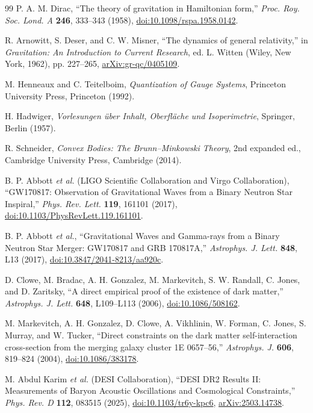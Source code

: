 \documentclass[aps,prd,reprint,nofootinbib,superscriptaddress,floatfix]{revtex4-2}
\numberwithin{equation}{section}
\theoremstyle{definition}
\theoremstyle{plain}
\begin{document}
\begin{thebibliography}{99}
P. A. M. Dirac,
``The theory of gravitation in Hamiltonian form,''
\emph{Proc. Roy. Soc. Lond. A} \textbf{246}, 333--343 (1958),
\href{https://doi.org/10.1098/rspa.1958.0142}{doi:10.1098/rspa.1958.0142}.

R. Arnowitt, S. Deser, and C. W. Misner,
``The dynamics of general relativity,''
in \emph{Gravitation: An Introduction to Current Research},
ed. L. Witten (Wiley, New York, 1962), pp. 227--265,
\href{https://arxiv.org/abs/gr-qc/0405109}{arXiv:gr-qc/0405109}.

M. Henneaux and C. Teitelboim,
\emph{Quantization of Gauge Systems},
Princeton University Press, Princeton (1992).

H. Hadwiger,
\emph{Vorlesungen \"uber Inhalt, Oberfl\"ache und Isoperimetrie},
Springer, Berlin (1957).

R. Schneider,
\emph{Convex Bodies: The Brunn--Minkowski Theory},
2nd expanded ed., Cambridge University Press, Cambridge (2014).

B. P. Abbott \emph{et al.} (LIGO Scientific Collaboration and Virgo Collaboration),
``GW170817: Observation of Gravitational Waves from a Binary Neutron Star Inspiral,''
\emph{Phys. Rev. Lett.} \textbf{119}, 161101 (2017),
\href{https://doi.org/10.1103/PhysRevLett.119.161101}{doi:10.1103/PhysRevLett.119.161101}.

B. P. Abbott \emph{et al.},
``Gravitational Waves and Gamma-rays from a Binary Neutron Star Merger: GW170817 and GRB 170817A,''
\emph{Astrophys. J. Lett.} \textbf{848}, L13 (2017),
\href{https://doi.org/10.3847/2041-8213/aa920c}{doi:10.3847/2041-8213/aa920c}.

D. Clowe, M. Bradac, A. H. Gonzalez, M. Markevitch, S. W. Randall, C. Jones, and D. Zaritsky,
``A direct empirical proof of the existence of dark matter,''
\emph{Astrophys. J. Lett.} \textbf{648}, L109--L113 (2006),
\href{https://doi.org/10.1086/508162}{doi:10.1086/508162}.

M. Markevitch, A. H. Gonzalez, D. Clowe, A. Vikhlinin, W. Forman, C. Jones, S. Murray, and W. Tucker,
``Direct constraints on the dark matter self-interaction cross-section from the merging galaxy cluster 1E 0657--56,''
\emph{Astrophys. J.} \textbf{606}, 819--824 (2004),
\href{https://doi.org/10.1086/383178}{doi:10.1086/383178}.


M. Abdul Karim \emph{et al.} (DESI Collaboration),
``DESI DR2 Results II: Measurements of Baryon Acoustic Oscillations and Cosmological Constraints,''
\emph{Phys. Rev. D} \textbf{112}, 083515 (2025),
\href{https://doi.org/10.1103/tr6y-kpc6}{doi:10.1103/tr6y-kpc6},
\href{https://arxiv.org/abs/2503.14738}{arXiv:2503.14738}.


\end{thebibliography}
\end{document}
